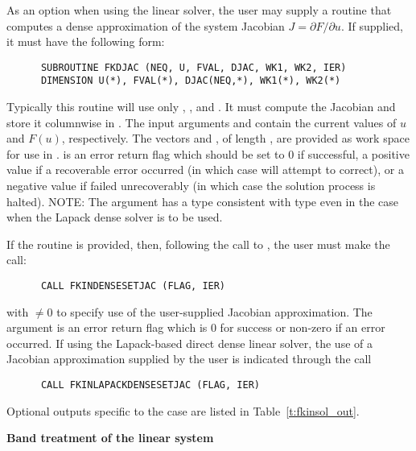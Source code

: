 \begin{Steps}
  As an option when using the {\dense} linear solver, the user may supply a
  routine that computes a dense approximation of the system Jacobian 
  $J = \partial F / \partial u$. If supplied, it must have the following form:
\begin{verbatim}
      SUBROUTINE FKDJAC (NEQ, U, FVAL, DJAC, WK1, WK2, IER)
      DIMENSION U(*), FVAL(*), DJAC(NEQ,*), WK1(*), WK2(*)
\end{verbatim}
  Typically this routine will use only , , and . 
  It must compute the Jacobian and store it columnwise in .
  The input arguments  and  contain the current
  values of $u$ and $F(u)$, respectively.
  The vectors  and ,
  of length , are provided as work space for use in .
   is an error return flag which should be set to $0$ if successful,
  a positive value if a recoverable error occurred (in which case {\kinsol}
  will attempt to correct), or a negative value if  failed
  unrecoverably (in which case the solution process is halted).
  NOTE: The argument  has a type consistent with {\C} type 
  even in the case when the Lapack dense solver is to be used.

  If the  routine is provided, then, 
  following the call to , the user must make the call:
\begin{verbatim}
      CALL FKINDENSESETJAC (FLAG, IER)
\end{verbatim}
  with  $\neq 0$ to specify use of the user-supplied Jacobian
  approximation.  The argument  is an error return flag which is $0$ 
  for success or non-zero if an error occurred.
  If using the Lapack-based direct dense linear solver, the use of a
  Jacobian approximation supplied by the user is indicated through the call
\begin{verbatim}
      CALL FKINLAPACKDENSESETJAC (FLAG, IER)
\end{verbatim}

  Optional outputs specific to the {\dense} case are listed in
  Table~\ref{t:fkinsol_out}.


  {\s} {\bf Band treatment of the linear system}
  

\end{Steps}
